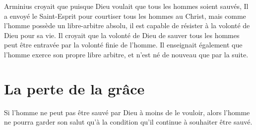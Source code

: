 \begin{pocketpar}{}
Arminius croyait que puisque Dieu voulait que tous les hommes soient sauvés,
 Il a envoyé le Saint-Esprit pour \og courtiser \fg{}
 tous les hommes au Christ,
 mais comme l'homme
 possède un \og libre-arbitre \fg{} absolu, il est capable de résister
 à la volonté de Dieu pour sa vie.
 Il croyait que la volonté de Dieu de sauver tous les hommes peut être
 entravée par la volonté finie de l'homme.
 Il enseignait également que l'homme exerce son propre libre arbitre,
 et n'est né de nouveau que par la suite.
\end{pocketpar}

\section*{La perte de la grâce}

Si l'homme ne peut pas être sauvé par Dieu à moins de le vouloir,
 alors l'homme ne pourra garder son salut qu'à la condition
 qu'il continue à souhaiter être sauvé.




